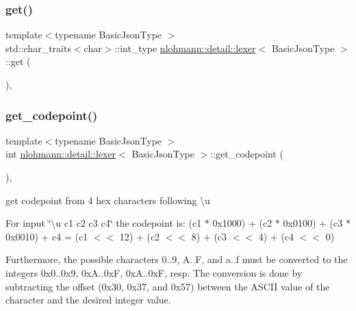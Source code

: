 \subsubsection{\texorpdfstring{get()}{get()}}
{\footnotesize\ttfamily template$<$typename Basic\+Json\+Type $>$ \\
std\+::char\+\_\+traits$<$char$>$\+::int\+\_\+type \mbox{\hyperlink{classnlohmann_1_1detail_1_1lexer}{nlohmann\+::detail\+::lexer}}$<$ Basic\+Json\+Type $>$\+::get (\begin{DoxyParamCaption}{ }\end{DoxyParamCaption})\hspace{0.3cm}{\ttfamily [inline]}, {\ttfamily [private]}}

\mbox{\label{classnlohmann_1_1detail_1_1lexer_a820b20e25ff255c3c791c37f2bf48380}} 
\subsubsection{\texorpdfstring{get\_codepoint()}{get\_codepoint()}}
{\footnotesize\ttfamily template$<$typename Basic\+Json\+Type $>$ \\
int \mbox{\hyperlink{classnlohmann_1_1detail_1_1lexer}{nlohmann\+::detail\+::lexer}}$<$ Basic\+Json\+Type $>$\+::get\+\_\+codepoint (\begin{DoxyParamCaption}{ }\end{DoxyParamCaption})\hspace{0.3cm}{\ttfamily [inline]}, {\ttfamily [private]}}



get codepoint from 4 hex characters following {\ttfamily \textbackslash{}u} 

For input \char`\"{}\textbackslash{}u c1 c2 c3 c4\char`\"{} the codepoint is\+: (c1 $\ast$ 0x1000) + (c2 $\ast$ 0x0100) + (c3 $\ast$ 0x0010) + c4 = (c1 $<$$<$ 12) + (c2 $<$$<$ 8) + (c3 $<$$<$ 4) + (c4 $<$$<$ 0)

Furthermore, the possible characters \textquotesingle{}0\textquotesingle{}..\textquotesingle{}9\textquotesingle{}, \textquotesingle{}A\textquotesingle{}..\textquotesingle{}F\textquotesingle{}, and \textquotesingle{}a\textquotesingle{}..\textquotesingle{}f\textquotesingle{} must be converted to the integers 0x0..0x9, 0xA..0xF, 0xA..0xF, resp. The conversion is done by subtracting the offset (0x30, 0x37, and 0x57) between the A\+S\+C\+II value of the character and the desired integer value.

